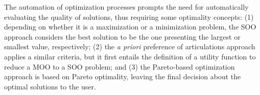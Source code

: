\begin{table}[]
	\end{table}
	
	The automation of optimization processes prompts the need for automatically evaluating the quality of solutions, thus requiring some optimality concepts: (1) depending on whether it is a maximization or a minimization problem, the \ac{SOO} approach considers the best solution to be the one presenting the largest or smallest value, respectively; (2) the \textit{a priori} preference of articulations approach applies a similar criteria, but it first entails the definition of a utility function to reduce a \ac{MOO} to a \ac{SOO} problem; and (3) the Pareto-based optimization approach is based on Pareto optimality, leaving the final decision about the optimal solutions to the user.
	
